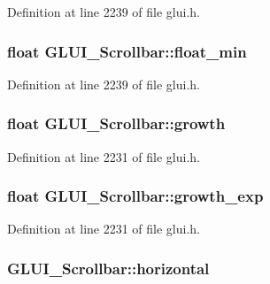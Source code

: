 Definition at line 2239 of file glui.\+h.

\hypertarget{class_g_l_u_i___scrollbar_ac758eab57fb82a16a44450941ec4ff2c}{
\subsubsection[{float\+\_\+min}]{\setlength{\rightskip}{0pt plus 5cm}float G\+L\+U\+I\+\_\+\+Scrollbar\+::float\+\_\+min}}\label{class_g_l_u_i___scrollbar_ac758eab57fb82a16a44450941ec4ff2c}


Definition at line 2239 of file glui.\+h.

\hypertarget{class_g_l_u_i___scrollbar_a7afb9f8788d3e9c1c5dc5668a06e0d1c}{
\subsubsection[{growth}]{\setlength{\rightskip}{0pt plus 5cm}float G\+L\+U\+I\+\_\+\+Scrollbar\+::growth}}\label{class_g_l_u_i___scrollbar_a7afb9f8788d3e9c1c5dc5668a06e0d1c}


Definition at line 2231 of file glui.\+h.

\hypertarget{class_g_l_u_i___scrollbar_aef25dbf49897d1a97d0a6e6419f44ec7}{
\subsubsection[{growth\+\_\+exp}]{\setlength{\rightskip}{0pt plus 5cm}float G\+L\+U\+I\+\_\+\+Scrollbar\+::growth\+\_\+exp}}\label{class_g_l_u_i___scrollbar_aef25dbf49897d1a97d0a6e6419f44ec7}


Definition at line 2231 of file glui.\+h.

\hypertarget{class_g_l_u_i___scrollbar_a88e6346cf53594ae33a97d0fb1b630d3}{
\subsubsection[{horizontal}]{ G\+L\+U\+I\+\_\+\+Scrollbar\+::horizontal}}\label{class_g_l_u_i___scrollbar_a88e6346cf53594ae33a97d0fb1b630d3}


